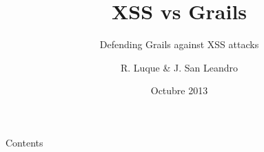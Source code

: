 \documentclass{beamer}
\title{XSS vs Grails}
\subtitle{Defending Grails against XSS attacks}
\author{R. Luque \& J. San Leandro}
\institute{%
  \href{http://twitter.com/rafael_luque}{@rafael\_luque} - \href{http://osoco.es}{Osoco}
  \hskip20pt
  \href{http://twitter.com/rydnr}{@rydnr} - \href{http://www.ventura24.es}{Ventura24}
}
\date[10/2013]{Octubre 2013}
\begin{document}
\begin{frame}[plain]
  \titlepage
\end{frame}

\begin{frame}[plain]{Contents}
  \tableofcontents[hideallsubsections]
\end{frame}


\end{document}
